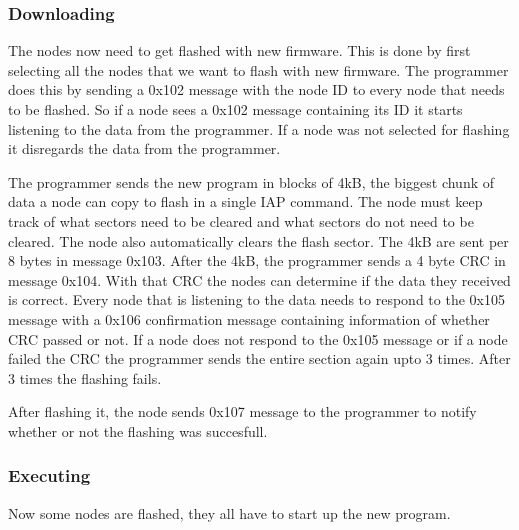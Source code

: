 \documentclass[twocolumn]{article}
\begin{document}
		\subsubsection*{Downloading}
			The nodes now need to get flashed with new firmware.
			This is done by first selecting all the nodes that we want to flash with new firmware.
			The programmer does this by sending a 0x102 message with the node ID to every node that needs to be flashed.
			So if a node sees a 0x102 message containing its ID it starts listening to the data from the programmer.
			If a node was not selected for flashing it disregards the data from the programmer.
			
			The programmer sends the new program in blocks of 4kB,
			the biggest chunk of data a node can copy to flash in a single IAP command.
			The node must keep track of what sectors need to be cleared and what sectors do not need to be cleared.
			The node also automatically clears the flash sector.
			The 4kB are sent per 8 bytes in message 0x103.
			After the 4kB, the programmer sends a 4 byte CRC in message 0x104.
			With that CRC the nodes can determine if the data they received is correct.
			Every node that is listening to the data needs to respond to the 0x105 message with a 0x106 confirmation message containing information of whether CRC passed or not.
			If a node does not respond to the 0x105 message or if a node failed the CRC the programmer sends the entire section again upto 3 times.
			After 3 times the flashing fails.
			
			After flashing it, the node sends 0x107 message to the programmer to notify whether or not the flashing was succesfull.
	

			\subsubsection*{Executing}
			Now some nodes are flashed, they all have to start up the new program.
	
\end{document}
